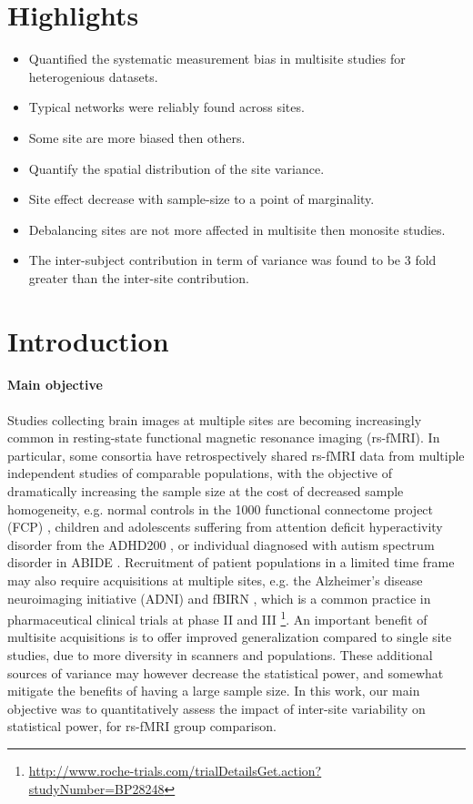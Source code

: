 \documentclass[authoryear]{elsarticle}
\begin{document}

\section*{Highlights}

\begin{itemize}
\item Quantified the systematic measurement bias in multisite studies for heterogenious datasets. 
\item Typical networks were reliably found across sites.
\item Some site are more biased then others.
\item Quantify the spatial distribution of the site variance.
\item Site effect decrease with sample-size to a point of marginality.
\item Debalancing sites are not more affected in multisite then monosite studies.
\item The inter-subject contribution in term of variance was found to be 3 fold greater than the inter-site contribution.
\end{itemize}

\section{Introduction}

\paragraph{Main objective}
Studies collecting brain images at multiple sites are becoming increasingly common in resting-state functional magnetic resonance imaging (rs-fMRI). In particular, some consortia have retrospectively shared rs-fMRI data from multiple independent studies of comparable populations, with the objective of dramatically increasing the sample size at the cost of decreased sample homogeneity, e.g. normal controls in the 1000 functional connectome project (FCP) \citep{Biswal2010}, children and adolescents suffering from attention deficit hyperactivity disorder from the ADHD200 \citep{ADHD200,Fair2012}, or individual diagnosed with autism spectrum disorder in ABIDE \citep{Nielsen2013}. Recruitment of patient populations in a limited time frame may also require acquisitions at multiple sites, e.g. the Alzheimer’s disease neuroimaging initiative (ADNI) \citep{Mueller2005} and fBIRN \citep{Friedman2006,Friedman2006a}, which is a common practice in pharmaceutical clinical trials at phase II and III \footnote{\url{http://www.roche-trials.com/trialDetailsGet.action?studyNumber=BP28248}}. An important benefit of multisite acquisitions is to offer improved generalization compared to single site studies, due to more diversity in scanners and populations. These additional sources of variance may however decrease the statistical power, and somewhat mitigate the benefits of having a large sample size. In this work, our main objective was to quantitatively assess the impact of inter-site variability on statistical power, for rs-fMRI group comparison.
\end{document}
